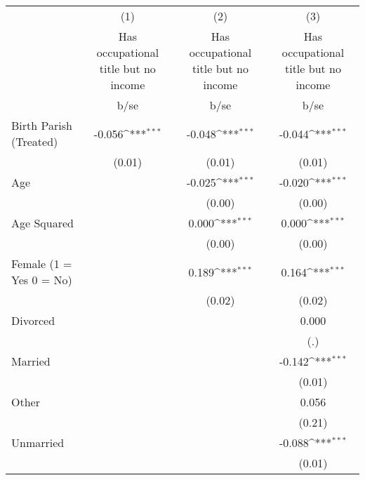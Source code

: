 {
\def\sym#1{\ifmmode^{#1}\else\(^{#1}\)\fi}
\begin{tabular}{l*{3}{c}}
\hline\hline
                    &\multicolumn{1}{c}{(1)}&\multicolumn{1}{c}{(2)}&\multicolumn{1}{c}{(3)}\\
                    &\multicolumn{1}{c}{Has occupational title but no income}&\multicolumn{1}{c}{Has occupational title but no income}&\multicolumn{1}{c}{Has occupational title but no income}\\
                    &        b/se         &        b/se         &        b/se         \\
\hline
Birth Parish (Treated)&      -0.056\sym{***}&      -0.048\sym{***}&      -0.044\sym{***}\\
                    &      (0.01)         &      (0.01)         &      (0.01)         \\
Age                 &                     &      -0.025\sym{***}&      -0.020\sym{***}\\
                    &                     &      (0.00)         &      (0.00)         \\
Age Squared         &                     &       0.000\sym{***}&       0.000\sym{***}\\
                    &                     &      (0.00)         &      (0.00)         \\
Female (1 = Yes 0 = No)&                     &       0.189\sym{***}&       0.164\sym{***}\\
                    &                     &      (0.02)         &      (0.02)         \\
Divorced            &                     &                     &       0.000         \\
                    &                     &                     &         (.)         \\
Married             &                     &                     &      -0.142\sym{***}\\
                    &                     &                     &      (0.01)         \\
Other               &                     &                     &       0.056         \\
                    &                     &                     &      (0.21)         \\
Unmarried           &                     &                     &      -0.088\sym{***}\\
                    &                     &                     &      (0.01)         \\

\end{tabular}}

